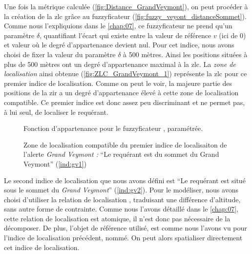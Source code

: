 Une fois la métrique calculée (\autoref{fig:Distance_GrandVeymont}),
on peut procéder à la création de la \ac{zlc} grâce au fuzzyficateur
(\autoref{fig:fuzzy_veyont_distanceSommet}). Comme nous l'expliquions
dans le \autoref{chap:07}, ce fuzzyficateur ne prend qu'un paramètre
\(\delta\), quantifiant l'écart qui existe entre la valeur de
référence \(v\) (ici de 0) et valeur où le degré d'appartenance
devient nul. Pour cet indice, nous avons choisi de fixer la valeur du
paramètre \(\delta\) à 500 mètres. Ainsi les positions situées à plus
de 500 mètres ont un degré d'appartenance maximal à la \ac{zlc}. La
\emph{zone de localisation} ainsi obtenue
(\autoref{fig:ZLC_GrandVeymont_1}) représente la \ac{zlc} pour ce
premier indice de localisation. Comme on peut le voir, la majeure
partie des positions de la \ac{zir} a un degré d'appartenance élevé à
cette zone de localisation compatible. Ce premier indice est donc
assez peu discriminant et ne permet pas, à lui seul, de localiser le
requérant.

\begin{figure}
  \centering
  
  \caption{Fonction d'appartenance pour le fuzzyficateur
    \protect{}, paramétrée.}
  \label{fig:fuzzy_veyont_distanceSommet}
\end{figure}

\begin{figure}
  \centering
  
  \caption{Zone de localisation compatible du premier indice de
    localisaiton de l'alerte \emph{Grand Veymont :} \enquote{Le
      requérant est \protect{}
      du sommet du Grand Veymont} (\ref{ind:gv1})}
  \label{fig:ZLC_GrandVeymont_1}
\end{figure}

Le second indice de localisation que nous avons défini est \enquote{Le
  requérant est situé sous le sommet du \emph{Grand Veymont}}
(\ref{ind:gv2}). Pour le modéliser, nous avons choisi d'utiliser la
relation de localisation , traduisant une
différence d'altitude, sans autre forme de contrainte. Comme nous
l'avons détaillé dans le \autoref{chap:07}, cette relation de
localisation est atomique, il n'est donc pas nécessaire de la
décomposer. De plus, l'objet de référence utilisé, est comme nous
l'avons vu pour l'indice de localisation précédent, nommé. On peut
alors spatialiser directement cet indice de localisation.

